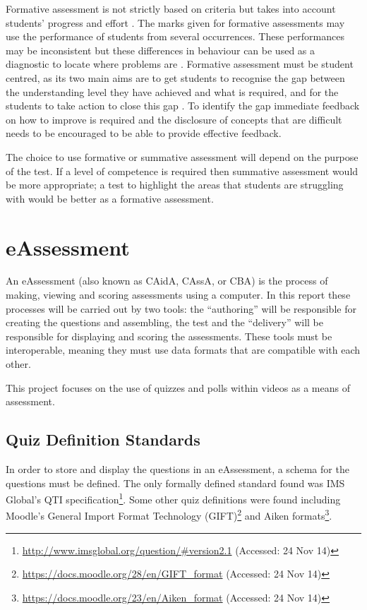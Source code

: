 Formative assessment is not strictly based on criteria but takes into account students' progress and effort \citep{assessmentTypes}. The marks given for formative assessments may use the performance of students from several occurrences. These performances may be inconsistent but these differences in behaviour can be used as a diagnostic to locate where problems are \citep{assessmentTypes}. Formative assessment must be student centred, as its two main aims are to get students to recognise the gap between the understanding level they have achieved and what is required, and for the students to take action to close this gap \citep{usesOfAssessment}. To identify the gap immediate feedback on how to improve is required \citep{eps265979} and the disclosure of concepts that are difficult needs to be encouraged \citep{knight2001briefing} to be able to provide effective feedback.

The choice to use formative or summative assessment will depend on the purpose of the test. If a level of competence is required then summative assessment would be more appropriate; a test to highlight the areas that students are struggling with would be better as a formative assessment.

\section{eAssessment}
An \gls{eAssessment} (also known as \gls{CAidA}, \gls{CAssA}, or \gls{CBA}) is the process of making, viewing and scoring assessments using a computer. In this report these processes will be carried out by two tools: the ``\gls{authoring}'' will be responsible for creating the questions and assembling, the test and the ``\gls{delivery}'' will be responsible for displaying and scoring the assessments. These tools must be interoperable, meaning they must use data formats that are compatible with each other.

This project focuses on the use of quizzes and polls within videos as a means of assessment.

\subsection{Quiz Definition Standards}
\label{Subsection:Quiz Definition Standards}

In order to store and display the questions in an \gls{eAssessment}, a schema for the questions must be defined. The only formally defined standard found was IMS Global's \gls{QTI} specification\footnote{\url{http://www.imsglobal.org/question/\#version2.1} (Accessed: 24 Nov 14)}. Some other quiz definitions were found including Moodle's General Import Format Technology (GIFT)\footnote{\url{https://docs.moodle.org/28/en/GIFT_format} (Accessed: 24 Nov 14)} and Aiken formats\footnote{\url{https://docs.moodle.org/23/en/Aiken_format} (Accessed: 24 Nov 14)}.

